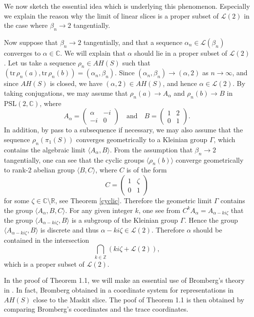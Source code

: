 \documentclass[12pt]{article}
\theoremstyle{plain}
\theoremstyle{definition}
\theoremstyle{remark}
\newcommand{\C}{\mathbb C}
\newcommand{\Z}{\mathbb Z}
\newcommand{\R}{\mathbb R}
\newcommand{\LL}{\mathcal L}
\newcommand{\alp}{\alpha}
\newcommand{\fty}{\infty}
\newcommand{\sm}{\setminus}
\newcommand{\la}{\langle}
\newcommand{\ra}{\rangle}
\newcommand{\ze}{\zeta}
\newcommand{\tr}{{\mathrm{tr}}}
\newcommand{\psl}{{\mathrm{PSL}}(2,\mathbb C)}
\begin{document}
 
 We now  sketch the essential idea which is underlying this phenomenon.  
 Especially we explain the reason why  
  the limit of linear slices is a proper subset of $\LL(2)$ 
  in the case where $\beta_n \to 2$ tangentially. 
  
  Now suppose that $\beta_n \to 2$ tangentially,  
  and that a sequence $\alp_n \in \LL(\beta_n)$ converges to $\alp \in \C$. 
  We will explain that $\alp$ should lie in a proper subset of $\LL(2)$. 
Let us take a sequence $\rho_n \in AH(S)$ such that 
$(\tr \,\rho_n(a),\tr\,\rho_n(b))=(\alp_n,\beta_n)$. 
 Since $(\alp_n, \beta_n) \to (\alp,2)$ as $n \to \fty$,  
 and since $AH(S)$ is closed, we have $(\alp,2) \in AH(S)$,  and hence $\alp \in \LL(2)$.  
By taking conjugations, we may assume that $\rho_n(a) \to A_\alp$ and 
$\rho_n(b) \to B$ in $\psl$, where 
$$
A_\alp=\left(\begin{array}{cc}
 \alp & -i \\ 
-i & 
0 \end{array}\right) 
\quad \text{and} \quad 
B=\left(\begin{array}{cc}
1  & 2 \\ 
0 & 1 
\end{array}\right). 
$$
In addition, by pass to a subsequence if necessary, we may also assume that the sequence 
$\rho_n(\pi_1(S))$ converges geometrically to 
a Kleinian group $\Gamma$, which contains the algebraic limit $\la A_\alp, B\ra$. 
From the assumption that  $\beta_n \to 2$ tangentially,  one can see that 
the cyclic groups $\la\rho_n(b) \ra$ converge geometrically to rank-$2$ abelian group 
 $\la B, C \ra$,  where $C$ is of the form 
$$
C=\left(\begin{array}{cc}
 1 &  \ze\\ 
0 & 1 
\end{array}\right)
$$
for some $\ze \in \C \sm \R$, see Theorem \ref{cyclic}. 
Therefore the geometric limit $\Gamma$ contains the group $\la A_\alp,B, C\ra$. 
For any given integer $k$, one see from $C^{k} A_\alp=A_{\alp-k i\ze}$ that 
the group $\la A_{\alp-ki\ze}, B\ra$ is a subgroup of the  Kleinian group $\Gamma$. 
Hence the group $\la A_{\alp-ki\ze}, B\ra$ is discrete and thus $\alp -ki\ze \in \LL(2)$. 
Therefore $\alp$ should be contained in the intersection 
$$
\bigcap_{k\in \Z} (k i\ze+\LL(2)),
$$ 
which is a proper subset of $\LL(2)$. 

In the proof of Theorem 1.1, 
we will make an essential use of Bromberg's theory in \cite{Br}. 
In fact, Bromberg obtained in \cite{Br} a coordinate system for representations in $AH(S)$ close to the 
Maskit slice. 
The poof of Theorem 1.1 is then obtained by comparing Bromberg's coordinates and the trace coordinates. 
\end{document}
